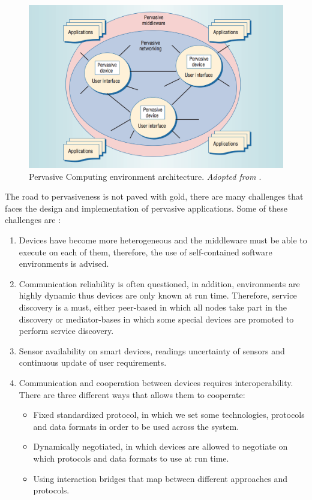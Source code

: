 \begin{figure}[H]
	\centering
	\includegraphics[scale=0.7]{images/pervasive-computing.png}
	\caption{Pervasive Computing environment architecture. \textit{Adopted from \cite{Saha:2003:PCP:642243.642248}}.}
 	\label{fig:pervaisive-computing}
\end{figure}

\noindent The road to pervasiveness is not paved with gold, there are many challenges that faces the design and implementation of pervasive applications. Some of these challenges are \cite{Schiele2010}:
\begin{enumerate}
\item Devices have become more heterogeneous and the middleware must be able to execute on each of them, therefore, the use of self-contained software environments is advised.
\item Communication reliability is often questioned, in addition,  environments are highly dynamic thus devices are only known at run time.   Therefore, service discovery is a must, either peer-based in which all nodes  take part in the discovery or mediator-bases in which some special devices are promoted to perform service discovery.
\item Sensor availability on smart devices, readings uncertainty of sensors and continuous update of user requirements.
\item Communication and cooperation between devices requires interoperability. There are three different ways that allows them to cooperate:

\begin{itemize}
\item Fixed standardized protocol, in which we set some technologies, protocols and data formats in order to be used across the system.
\item Dynamically negotiated, in which devices are allowed to negotiate on which protocols and data formats to use  at run time.
\item Using interaction bridges that map between different approaches and protocols.
\end{itemize}

\end{enumerate} 



